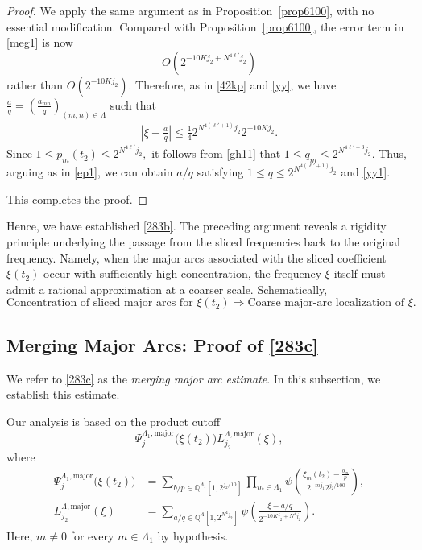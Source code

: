 \documentclass[10pt,a4paper]{amsart}
\numberwithin{equation}{section}
\begin{document}
\begin{proof}
We apply the same argument as in Proposition~\ref{prop6100}, with no essential modification. Compared with Proposition~\ref{prop6100}, the error term in \eqref{meg1} is now \[ O\!\left(2^{-10K j_2 + N^{4\ell'} j_2}\right) \]
rather than $O(2^{-10Kj_2})$. Therefore, as in \eqref{42kp} and \eqref{yy}, we have $\frac{a}{q}
=
\left( \frac{a_{mn}}{q} \right)_{(m,n)\in \Lambda}$ such that
\begin{align}\label{yy1}
	\left|\xi-\frac{a}{q}\right|
	\le \frac{1}{4}
	2^{N^{4(\ell'+1)}j_2}2^{-10Kj_2}.
\end{align}
Since
$
1\le p_m(t_2)\le 2^{N^{4\ell'}j_2},
$
it follows from \eqref{gh11} that
$
1\le q_m\le 2^{N^{4\ell'+3}j_2}.
$
Thus, arguing as in \eqref{ep1}, we can obtain $a/q$ satisfying 
$
1\le q\le 2^{N^{4(\ell'+1)}j_2}
$ and \eqref{yy1}.

This completes the proof.

\end{proof}
Hence, we have established \eqref{283b}. The preceding argument reveals a rigidity principle underlying the passage from the sliced frequencies back to the original frequency. Namely, when the major arcs associated with the sliced coefficient $\xi(t_2)$ occur with sufficiently high concentration, the frequency $\xi$ itself must admit a rational approximation at a coarser scale. Schematically, $$
\text{Concentration of sliced major arcs for $\xi(t_2)$}
\Longrightarrow
\text{Coarse major-arc localization of $\xi$.}
$$


 

\subsection{Merging Major Arcs: Proof of \eqref{283c}}\label{Sec5.4}
We refer to \eqref{283c} as the \emph{merging major arc estimate}. In this subsection, we establish this estimate.

Our analysis is based on the product cutoff
\[
\Psi^{\Lambda_1,\mathrm{major}}_{j}\bigl(\xi(t_2)\bigr)
L^{\Lambda,\mathrm{major}}_{j_2}(\xi),
\]
where
\begin{align}
\Psi^{\Lambda_1,\mathrm{major}}_{j}\bigl(\xi(t_2)\bigr)
&=
\sum_{b/p\in\mathbb{Q}^{\Lambda_1}[1,2^{j_2/10}]}
\prod_{m\in\Lambda_1}
\psi\!\left(
\frac{\xi_m(t_2)-\frac{b_m}{p}}
{2^{-mj_1}2^{j_2/100}}
\right),\label{put3}\\
L^{\Lambda,\mathrm{major}}_{j_2}(\xi)
&=
\sum_{a/q\in\mathbb{Q}^{\Lambda}[1,2^{N^4j_2}]}
\psi\!\left(
\frac{\xi-a/q}
{2^{-10Kj_2+N^4j_2}}
\right).\nonumber
\end{align} 
Here, $m\neq0$ for every $m\in\Lambda_1$ by hypothesis.
 
\end{document}
